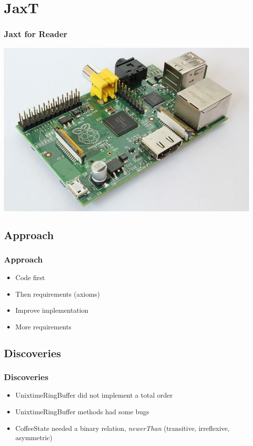 \documentclass{beamer}
\begin{document}
\section{JaxT}
\begin{frame}
    \frametitle{Jaxt for Reader}
    \includegraphics[scale=0.46]{images/rpi.jpg}
\end{frame}

\subsection{Approach}
\begin{frame}
    \frametitle{Approach}
    \begin{itemize}
        \item Code first
        \item Then requirements (axioms)
        \item Improve implementation
        \item More requirements
    \end{itemize}
\end{frame}

\subsection{Discoveries}
\begin{frame}
    \frametitle{Discoveries}
    \begin{itemize}
        \item UnixtimeRingBuffer did not implement a total order
        \item UnixtimeRingBuffer methods had some bugs
        \item CoffeeState needed a binary relation, \emph{newerThan} (transitive, irreflexive, asymmetric)
    \end{itemize}
\end{frame}
\end{document}
